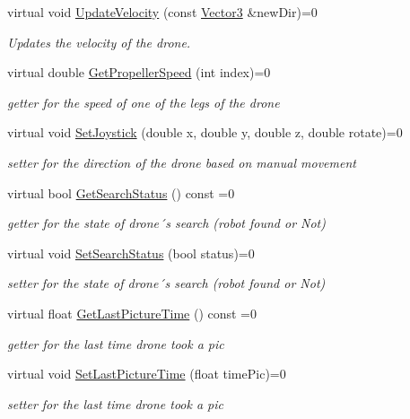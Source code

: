 \begin{DoxyCompactItemize}
virtual void \hyperlink{classIDrone_a5cc88b8205adaeea8f71c822d08e1607}{Update\+Velocity} (const \hyperlink{classVector3}{Vector3} \&new\+Dir)=0
\begin{DoxyCompactList}\small\item\em Updates the velocity of the drone. \end{DoxyCompactList}\item 
virtual double \hyperlink{classIDrone_a60a9a7eb90bf13100d66cb47b99830ed}{Get\+Propeller\+Speed} (int index)=0
\begin{DoxyCompactList}\small\item\em getter for the speed of one of the legs of the drone \end{DoxyCompactList}\item 
virtual void \hyperlink{classIDrone_a8414edd320f25869fb04a880eae0d554}{Set\+Joystick} (double x, double y, double z, double rotate)=0
\begin{DoxyCompactList}\small\item\em setter for the direction of the drone based on manual movement \end{DoxyCompactList}\item 
virtual bool \hyperlink{classIDrone_aed9abde2152408ef3483da57f24c4006}{Get\+Search\+Status} () const =0
\begin{DoxyCompactList}\small\item\em getter for the state of drone´s search (robot found or Not) \end{DoxyCompactList}\item 
virtual void \hyperlink{classIDrone_ac6f580814e7091ea64ecf2a7137b8120}{Set\+Search\+Status} (bool status)=0
\begin{DoxyCompactList}\small\item\em setter for the state of drone´s search (robot found or Not) \end{DoxyCompactList}\item 
virtual float \hyperlink{classIDrone_a112d19971ac7d94dba9e2f25ad667c0d}{Get\+Last\+Picture\+Time} () const =0
\begin{DoxyCompactList}\small\item\em getter for the last time drone took a pic \end{DoxyCompactList}\item 
virtual void \hyperlink{classIDrone_aace45f6d9a77bfc8c61bd0ffc30a3b8e}{Set\+Last\+Picture\+Time} (float time\+Pic)=0
\begin{DoxyCompactList}\small\item\em setter for the last time drone took a pic \end{DoxyCompactList}\item 

\end{DoxyCompactItemize}
